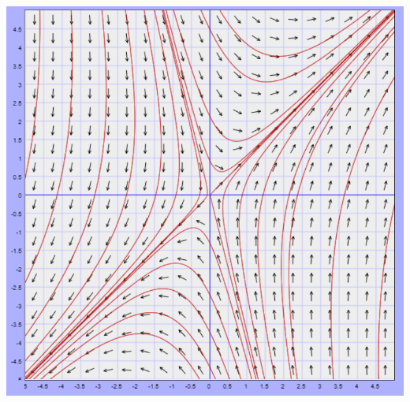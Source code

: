 \documentclass[12pt]{article}
\begin{document}
\begin{enumerate}
    \includegraphics{Images/pplane-b.png}

\end{enumerate}

\pagebreak
\end{document}
